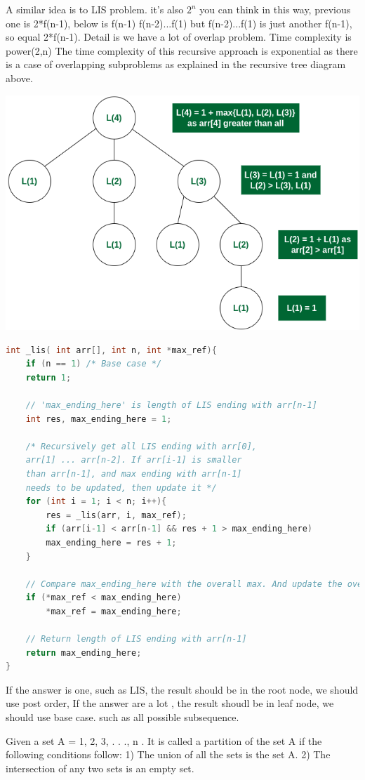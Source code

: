\documentclass[a4paper,11pt,twoside]{book}
\begin{document}
	\par A similar idea is to LIS problem. it's also $2^n$
	you can think in this way, previous one is 2*f(n-1), below is f(n-1) f(n-2)...f(1)
	but f(n-2)...f(1) is just another f(n-1), so equal 2*f(n-1). Detail is we have a lot of overlap problem.
	Time complexity is power(2,n) The time complexity of this recursive approach is exponential as there is a case of overlapping subproblems as explained in the recursive tree diagram above.
	\begin{center}
		\includegraphics[width=0.5\linewidth]{pics/lis}
	\end{center}
	
\begin{lstlisting}[frame=single, language=c++]
int _lis( int arr[], int n, int *max_ref){
	if (n == 1) /* Base case */
	return 1;
	
	// 'max_ending_here' is length of LIS ending with arr[n-1]
	int res, max_ending_here = 1;
	
	/* Recursively get all LIS ending with arr[0],
	arr[1] ... arr[n-2]. If arr[i-1] is smaller
	than arr[n-1], and max ending with arr[n-1]
	needs to be updated, then update it */
	for (int i = 1; i < n; i++){
		res = _lis(arr, i, max_ref);
		if (arr[i-1] < arr[n-1] && res + 1 > max_ending_here)
		max_ending_here = res + 1;
	}
	
	// Compare max_ending_here with the overall max. And update the overall max if needed
	if (*max_ref < max_ending_here)
		*max_ref = max_ending_here;
	
	// Return length of LIS ending with arr[n-1]
	return max_ending_here;
}	
\end{lstlisting}	
	
	
	\par If the answer is one, such as LIS, the result should be in the root node, we should use post order, If the answer are a lot , the result shoudl be in leaf node, we should use base case. such as all possible subsequence. 
	
	
	\par Given a set A = {1, 2, 3, . . ., n }. It is called a partition of the set A if the following conditions follow: 1) The union of all the sets is the set A. 2) The intersection of any two sets is an empty set.
\end{document}
